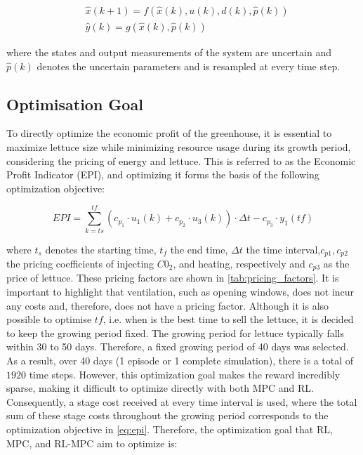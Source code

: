 \begin{equation}\label{eq:greenhouse_model_discrete_uncertain}
	\begin{aligned}
		& \hat x(k+1) = f(\hat x(k),u(k),d(k),\hat p(k)) \\
		& \hat y(k) = g(\hat x(k),\hat p(k))
	\end{aligned}
\end{equation}

where the states and output measurements of the system are uncertain and $\hat{p}(k)$ denotes the uncertain parameters and is resampled at every time step.



\subsection{Optimisation Goal}
\label{ssection:optimization-goal}
To directly optimize the economic profit of the greenhouse, it is essential to maximize lettuce size while minimizing resource usage during its growth period, considering the pricing of energy and lettuce. This is referred to as the Economic Profit Indicator (EPI), and optimizing it forms the basis of the following optimization objective:

\begin{equation}\label{eq:epi}
	EPI = \sum_{k = ts}^{tf} (c_{p_1} \cdot u_1(k) + c_{p_2} \cdot u_3(k))\cdot \Delta t - c_{p_3} \cdot y_1(tf)
\end{equation}

where $t_s$ denotes the starting time, $t_f$ the end time, $\Delta t$ the time interval,$c_{p1},c_{p2}$ the pricing coefficients of injecting $C0_2$, and heating, respectively and $c_{p3}$ as the price of lettuce. These pricing factors are shown in \autoref{tab:pricing_factors}. It is important to highlight that ventilation, such as opening windows, does not incur any costs and, therefore, does not have a pricing factor. Although it is also possible to optimise $tf$, i.e. when is the best time to sell the lettuce, it is decided to keep the growing period fixed. The growing period for lettuce typically falls within 30 to 50 days. Therefore, a fixed growing period of 40 days was selected. As a result, over 40 days (1 episode or 1 complete simulation), there is a total of $1920$ time steps. 
However, this optimization goal makes the reward incredibly sparse, making it difficult to optimize directly with both MPC and RL. Consequently, a stage cost received at every time interval is used, where the total sum of these stage costs throughout the growing period corresponds to the optimization objective in \autoref{eq:epi}. Therefore, the optimization goal that RL, MPC, and RL-MPC aim to optimize is:

